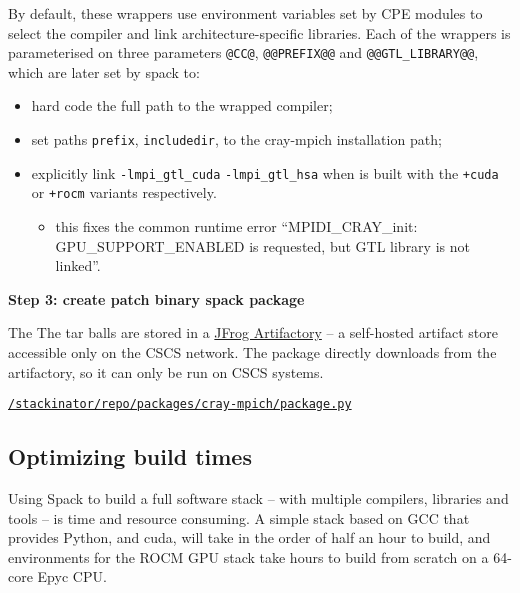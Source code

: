 By default, these wrappers use environment variables set by CPE modules to select the compiler and link architecture-specific libraries.
Each of the wrappers is parameterised on three parameters \lstinline{@CC@}, \lstinline{@@PREFIX@@} and \lstinline{@@GTL_LIBRARY@@}, which are later set by spack to:
\begin{itemize}
    \item hard code the full path to the wrapped compiler;
    \item set paths \lstinline{prefix}, \lstinline{includedir}, to the cray-mpich \spack installation path;
    \item explicitly link \lstinline{-lmpi_gtl_cuda} \lstinline{-lmpi_gtl_hsa} when \craympich is built with the \lstinline{+cuda} or \lstinline{+rocm} variants respectively.
    \begin{itemize}
        \item this fixes the common runtime error ``MPIDI\_CRAY\_init: GPU\_SUPPORT\_ENABLED is requested, but GTL library is not linked''.
    \end{itemize}
\end{itemize}


\textbf{Step 3: create patch binary spack package}

The 
The tar balls are stored in a \href{https://jfrog.com/artifactory/}{JFrog Artifactory} -- a self-hosted artifact store accessible only on the CSCS network.
The \spack package directly downloads from the artifactory, so it can only be run on CSCS systems.

\href{https://github.com/eth-cscs/stackinator/blob/master/stackinator/repo/packages/cray-mpich/package.py}{\lstinline{/stackinator/repo/packages/cray-mpich/package.py}}

\subsection{Optimizing build times}

Using Spack to build a full software stack -- with multiple compilers, libraries and tools -- is time and resource consuming.
A simple stack based on GCC that provides Python, \craympich and cuda, will take in the order of half an hour to build, and environments for the ROCM GPU stack take hours to build from scratch on a 64-core Epyc CPU.

